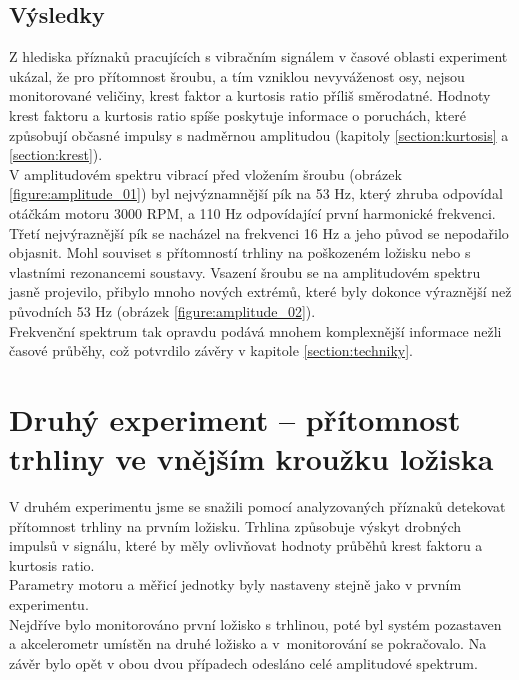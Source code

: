     \subsection{Výsledky}
        Z hlediska příznaků pracujících s vibračním signálem v časové oblasti experiment ukázal, že pro přítomnost šroubu, a tím vzniklou nevyváženost osy, nejsou monitorované veličiny, krest faktor a kurtosis ratio příliš směrodatné. Hodnoty krest faktoru a kurtosis ratio spíše poskytuje informace o poruchách, které způsobují občasné impulsy s nadměrnou amplitudou (kapitoly \ref{section:kurtosis} a \ref{section:krest}).\\ 
        V amplitudovém spektru vibrací před vložením šroubu (obrázek \ref{figure:amplitude_01}) byl nejvýznamnější pík na 53 Hz, který zhruba odpovídal otáčkám motoru 3000 RPM, a 110 Hz odpovídající první harmonické frekvenci. Třetí nejvýraznější pík se nacházel na frekvenci 16 Hz a jeho původ se nepodařilo objasnit. Mohl souviset s přítomností trhliny na poškozeném ložisku nebo s vlastními rezonancemi soustavy.
        Vsazení šroubu se na amplitudovém spektru jasně projevilo, přibylo mnoho nových extrémů, které byly dokonce výraznější než původních 53 Hz (obrázek \ref{figure:amplitude_02}).\\
        Frekvenční spektrum tak opravdu podává mnohem komplexnější informace nežli časové průběhy, což potvrdilo závěry v kapitole \ref{section:techniky}.
    
            
    \section{Druhý experiment – přítomnost trhliny ve vnějším kroužku ložiska}
        V druhém experimentu jsme se snažili pomocí analyzovaných příznaků detekovat přítomnost trhliny na prvním ložisku. Trhlina způsobuje výskyt drobných impulsů v signálu, které by měly ovlivňovat hodnoty průběhů krest faktoru a kurtosis ratio.\\
        Parametry motoru a měřicí jednotky byly nastaveny stejně jako v prvním experimentu.\\
        Nejdříve bylo monitorováno první ložisko s trhlinou, poté byl systém pozastaven a akcelerometr umístěn na druhé ložisko a v~monitorování se pokračovalo. Na závěr bylo opět v obou dvou případech odesláno celé amplitudové spektrum.
        
